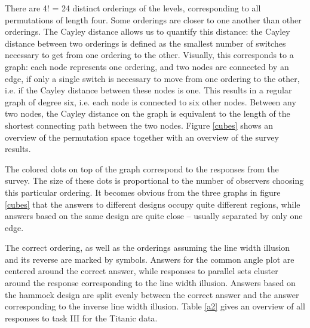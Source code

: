 \documentclass[journal]{vgtc}\usepackage{graphicx, color}
\begin{document}
There are 4! = 24 distinct orderings of the levels, corresponding to all permutations of length four. Some orderings are closer to one another than other orderings. 
The Cayley distance allows us to quantify this distance: the Cayley distance between two orderings is defined as the smallest number of switches necessary to get from one ordering to the other. Visually, this corresponds to a graph: each node represents one ordering, and two nodes are connected by an edge, if only a single switch is necessary to move from one ordering to the other, i.e. if the Cayley distance between these nodes is one.
This results  in a  regular graph of degree six, i.e. each  node is connected to six other nodes. Between any two nodes, the Cayley distance on the graph is equivalent to the length of the shortest connecting path between the two nodes.
Figure \ref{cubes} shows an overview of the permutation space together with an overview of the survey results. 

The colored dots on top of the graph correspond to the responses from the survey. The size of these dots is proportional to the number of observers choosing this particular ordering. It becomes obvious from the three graphs in figure \ref{cubes} that
the answers to different designs occupy quite different regions, while answers based  on the same design are quite close --  usually separated by only one edge. 

The correct ordering, as well as the orderings assuming the line width illusion and its reverse are marked by symbols. Answers for the common angle plot are centered around the correct answer, while responses to parallel sets  cluster around the response corresponding to the line width illusion. Answers based on the hammock design are split evenly between the correct answer and the answer corresponding to the  inverse line width illusion. Table \ref{a2} gives an overview of all responses to task III for the Titanic data.
\end{document}
